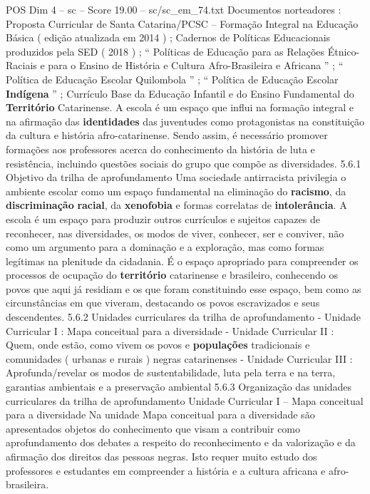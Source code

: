 \begin{textsample}{POS Dim 4 – sc – Score 19.00 – sc/sc\_em\_74.txt}
Documentos norteadores : Proposta Curricular de Santa Catarina/PCSC – Formação Integral na Educação Básica ( edição atualizada em 2014 ) ; Cadernos de Políticas Educacionais produzidos pela SED ( 2018 ) ; “ Políticas de Educação para as Relações Étnico-Raciais e para o Ensino de História e Cultura Afro-Brasileira e Africana ” ; “ Política de Educação Escolar Quilombola ” ; “ Política de Educação Escolar \textbf{Indígena} ” ; Currículo Base da Educação Infantil e do Ensino Fundamental do \textbf{Território} Catarinense.
A escola é um espaço que influi na formação integral e na afirmação das \textbf{identidades} das juventudes como protagonistas na constituição da cultura e história afro-catarinense.
Sendo assim, é necessário promover formações aos professores acerca do conhecimento da história de luta e resistência, incluindo questões sociais do grupo que compõe as diversidades. 5.6.1 Objetivo da trilha de aprofundamento Uma sociedade antirracista privilegia o ambiente escolar como um espaço fundamental na eliminação do \textbf{racismo}, da \textbf{discriminação} \textbf{racial}, da \textbf{xenofobia} e formas correlatas de \textbf{intolerância}.
A escola é um espaço para produzir outros currículos e sujeitos capazes de reconhecer, nas diversidades, os modos de viver, conhecer, ser e conviver, não como um argumento para a dominação e a exploração, mas como formas legítimas na plenitude da cidadania.
É o espaço apropriado para compreender os processos de ocupação do \textbf{território} catarinense e brasileiro, conhecendo os povos que aqui já residiam e os que foram constituindo esse espaço, bem como as circunstâncias em que viveram, destacando os povos escravizados e seus descendentes. 5.6.2 Unidades curriculares da trilha de aprofundamento - Unidade Curricular I : Mapa conceitual para a diversidade - Unidade Curricular II : Quem, onde estão, como vivem os povos e \textbf{populações} tradicionais e comunidades ( urbanas e rurais ) negras catarinenses - Unidade Curricular III : Aprofunda/revelar os modos de sustentabilidade, luta pela terra e na terra, garantias ambientais e a preservação ambiental 5.6.3 Organização das unidades curriculares da trilha de aprofundamento Unidade Curricular I – Mapa conceitual para a diversidade Na unidade Mapa conceitual para a diversidade são apresentados objetos do conhecimento que visam a contribuir como aprofundamento dos debates a respeito do reconhecimento e da valorização e da afirmação dos direitos das pessoas negras.
Isto requer muito estudo dos professores e estudantes em compreender a história e a cultura africana e afro-brasileira.

\end{textsample}
